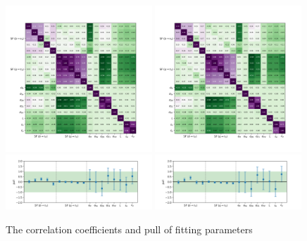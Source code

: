 \begin{figure}
    \centering
    \includegraphics[width=0.49\textwidth]{chapters/Appendix/sectionJetToTauh/figures/corr2_lltauTight_splitJetFlavor.png}
    \includegraphics[width=0.49\textwidth]{chapters/Appendix/sectionJetToTauh/figures/corr2_lltauVTight_splitJetFlavor.png}
    \includegraphics[width=0.49\textwidth]{chapters/Appendix/sectionJetToTauh/figures/pull2_lltauTight_splitJetFlavor.png}
    \includegraphics[width=0.49\textwidth]{chapters/Appendix/sectionJetToTauh/figures/pull2_lltauVTight_splitJetFlavor.png}
    \caption{The correlation coefficients and pull of fitting parameters}
    \label{fig:appendix:fakeTauId:fitparam}
\end{figure}

